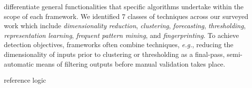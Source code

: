 \documentclass[manuscript,nonacm]{acmart}
\begin{document}
\vspace{0.25em}
 differentiate general functionalities that specific algorithms undertake within the scope of each framework.
We identified 7 classes of techniques across our surveyed work which include \textit{dimensionality reduction}, \textit{clustering}, \textit{forecasting}, \textit{thresholding}, \textit{representation learning},
\textit{frequent pattern mining}, and \textit{fingerprinting}. 
To achieve detection objectives, frameworks often combine techniques, \textit{e.g.}, reducing the dimensionality of inputs prior to clustering or 
thresholding as a final-pass, semi-automatic means of filtering outputs before manual validation takes place.



\vspace{0.25em}
 reference logic 

\end{document}
